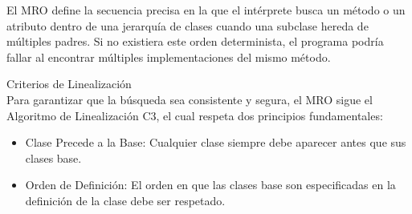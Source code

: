 \documentclass{article}
\begin{document}
El MRO define la secuencia precisa en la que el intérprete busca un método o un atributo dentro de una jerarquía de clases cuando una subclase hereda de múltiples padres. Si no existiera este orden determinista, el programa podría fallar al encontrar múltiples implementaciones del mismo método.

\vspace{1.0em}

\large{Criterios de Linealización}
\\
Para garantizar que la búsqueda sea consistente y segura, el MRO sigue el Algoritmo de Linealización C3, el cual respeta dos principios fundamentales:

\begin{itemize}
    \item {Clase Precede a la Base:} Cualquier clase siempre debe aparecer antes que sus clases base.
    \item {Orden de Definición:} El orden en que las clases base son especificadas en la definición de la clase debe ser respetado.
\end{itemize}
\end{document}
